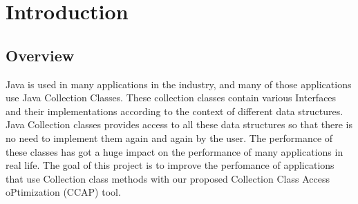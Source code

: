 \chapter{Introduction}

\section{Overview}
Java is used in many applications in the industry, and many of those applications use Java Collection Classes. These collection classes contain various Interfaces and their implementations according to the context of different data structures. Java Collection classes provides access to all these data structures so that there is no need to implement them again and again by the user. The performance of these classes has got a huge impact on the performance of many applications in real life. The goal of this project is to improve the perfomance of applications that use Collection class methods with our proposed Collection Class Access oPtimization (CCAP) tool.

